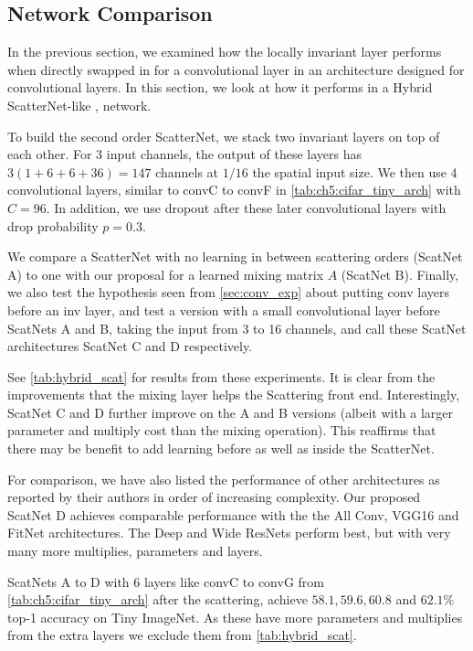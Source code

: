 

\subsection{Network Comparison}\label{sec:scat_exp}
In the previous section, we examined how the locally invariant layer performs when
directly swapped in for a convolutional layer in an architecture designed
for convolutional layers. In this section, we look at how
it performs in a Hybrid ScatterNet-like \cite{oyallon_hybrid_2017,oyallon_scaling_2017},
network.

To build the second order ScatterNet, we stack two invariant layers on top of each
other. For 3 input channels, the output of these layers has $3(1 +
6 + 6 +36) = 147$ channels at $1/16$ the spatial input size. We then use 4
convolutional layers, similar to convC to convF in \autoref{tab:ch5:cifar_tiny_arch} with
$C=96$. In addition, we use dropout after these later convolutional layers with
drop probability $p=0.3$.

We compare a ScatterNet with no learning in between scattering orders
(ScatNet A) to one with our proposal for a learned mixing matrix $A$ (ScatNet B). Finally,
we also test the hypothesis seen from \autoref{sec:conv_exp} about putting conv
layers before an inv layer, and test a version with a small convolutional layer
before ScatNets A and B, taking the input from 3 to 16 channels, and call these ScatNet
architectures ScatNet C and D respectively.

See \autoref{tab:hybrid_scat} for results from these experiments. It is clear from
the improvements that the mixing layer helps the Scattering front end.
Interestingly, ScatNet C and D further improve on the A and B versions
(albeit with a larger parameter and multiply cost than the mixing operation). This reaffirms that there
may be benefit to add learning before as well as inside the ScatterNet.

For comparison, we have also listed the performance of other architectures as
reported by their authors in order of increasing complexity. Our proposed ScatNet D achieves
comparable performance with the the All Conv, VGG16 and FitNet architectures.
The Deep\cite{he_identity_2016} and Wide\cite{zagoruyko_wide_2016}
ResNets perform best, but with very many more
multiplies, parameters and layers.

ScatNets A to D with 6 layers like convC to convG from \autoref{tab:ch5:cifar_tiny_arch} after
the scattering, achieve $58.1, 59.6, 60.8$ and $62.1\%$ top-1 accuracy on Tiny ImageNet. As
these have more parameters and multiplies from the extra layers we exclude them
from \autoref{tab:hybrid_scat}.


